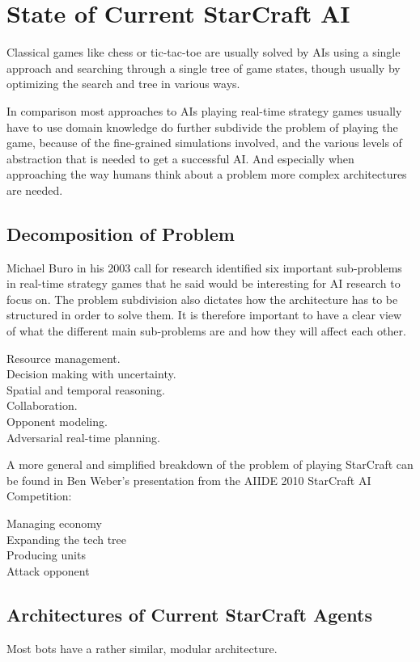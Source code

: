 
\section{State of Current StarCraft AI}
\label{sec:stateofai}

Classical games like chess or tic-tac-toe are usually solved by AIs using a
single approach and searching through a single tree of game states, though
usually by optimizing the search and tree in various ways.

In comparison most approaches to AIs playing real-time strategy games usually
have to use domain knowledge do further subdivide the problem of playing the
game, because of the fine-grained simulations involved, and the various levels
of abstraction that is needed to get a successful AI. And especially when
approaching the way humans think about a problem more complex architectures
are needed.

\subsection{Decomposition of Problem}
Michael Buro in his 2003 call for research \cite{buro2003real} identified six
important sub-problems in real-time strategy games that he said would be
interesting for AI research to focus on. The problem subdivision also dictates
how the architecture has to be structured in order to solve them. It is
therefore important to have a clear view of what the different main sub-problems
are and how they will affect each other.

\begin{description}
  \item [Resource management.] 
  \item [Decision making with uncertainty.]
  \item [Spatial and temporal reasoning.]
   \item [Collaboration.]
  \item [Opponent modeling.]
  \item [Adversarial real-time planning.]
\end{description}

A more general and simplified breakdown of the problem of playing StarCraft can
be found in Ben Weber's presentation from the AIIDE 2010 StarCraft AI
Competition:\cite{weber2010aiide}

\begin{description}
  \item [Managing economy]
  \item [Expanding the tech tree]
  \item [Producing units]
  \item [Attack opponent]
\end{description}

\subsection{Architectures of Current StarCraft Agents}
Most bots have a rather similar, modular architecture.